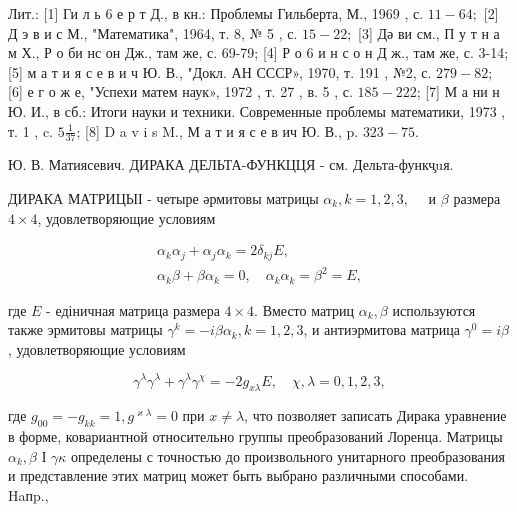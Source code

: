 \documentclass[10pt]{article}
\begin{document}
Лит.: [1] Ги л ь 6 е р т Д., в кн.: Проблемы Гильберта, М., 1969 , с. $11-64 ;$ [2] Д э в и с М., "Математика", 1964, т. 8, № 5 , с. $15-22 ;$ [3] Дә ви см., П у т н а м Х., Р о би нс он Дж., там же, с. 69-79; [4] Р о 6 и н с о н Д ж., там же, с. 3-14; [5] м а т и я с е в и ч Ю. В., "Докл. АН СССР», 1970, т. 191 , №2, с. $279-82 ;$ [6] е г о ж е, "Успехи матем наук», 1972 , т. 27 , в. 5 , с. $185-222$; [7] М а ни н Ю. И., в сб.: Итоги науки и техники. Современные проблемы математики, 1973 , т. 1 , c. $5 \frac{1}{37}$; [8] D a v i s M., М а т и я с е в ич Ю. В., p. $323-75$.

Ю. В. Матиясевич. ДИРАКА ДЕЛЬТА-ФУНКЦЦЯ - см. Дельта-функч̧uя.



ДИРАКА МАТРИЦЫІ - четыре әрмитовы матрицы $\alpha_{k}, k=1,2,3, \quad$ и $\beta$ размера $4 \times 4$, удовлетворяющие условиям



\[

\begin{gathered}

\alpha_{k} \alpha_{j}+\alpha_{j} \alpha_{k}=2 \delta_{k j} E, \\

\alpha_{k} \beta+\beta \alpha_{k}=0, \quad \alpha_{k} \alpha_{k}=\beta^{2}=E,

\end{gathered}

\]



где $E$ - едіничная матрица размера $4 \times 4$. Вместо матриц $\alpha_{k}, \beta$ используются также эрмитовы матрицы $\gamma^{k}=-i \beta \alpha_{k}, k=1,2,3$, и антиэрмитова матрица $\gamma^{0}=i \beta$, удовлетворяющие условиям



\[

\gamma^{\lambda} \gamma^{\lambda}+\gamma^{\lambda} \gamma^{\chi}=-2 g_{x \lambda} E, \quad \chi, \lambda=0,1,2,3,

\]



где $g_{00}=-g_{k k}=1, g^{\varkappa \lambda}=0$ при $x \neq \lambda$, что позволяет записать Дирака уравнение в форме, ковариантной относительно группы преобразований Лоренца. Матрицы $\alpha_{k}, \beta$ І $\gamma \kappa$ определены с точностью до произвольного унитарного преобразования и представление этих матриц может быть выбрано различными способами. Haпp.,
\end{document}

